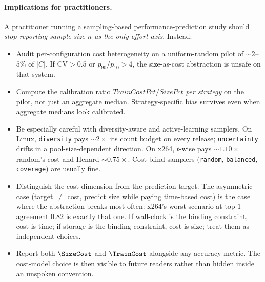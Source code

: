 \paragraph*{Implications for practitioners.}
A practitioner running a sampling-based performance-prediction study should
\emph{stop reporting sample size $n$ as the only effort axis}. Instead:
\begin{itemize}
    \item Audit per-configuration cost heterogeneity on a uniform-random
    pilot of $\sim\!\!2$--$5\%$ of $|C|$. If $\mathrm{CV}\!>\!0.5$ or
    $p_{90}/p_{10}\!>\!4$, the size-as-cost abstraction is unsafe on
    that system.
    \item Compute the calibration ratio
    $\mathit{TrainCostPct}/\mathit{SizePct}$ \emph{per strategy} on the
    pilot, not just an aggregate median. Strategy-specific bias
    survives even when aggregate medians look calibrated.
    \item Be especially careful with diversity-aware and active-learning
    samplers. On Linux, \texttt{diversity} pays $\sim\!\!2\times$ its
    count budget on every release; \texttt{uncertainty} drifts in a
    pool-size-dependent direction. On x264, $t$-wise pays
    $\sim\!\!1.10\times$ random's cost and Henard $\sim\!\!0.75\times$.
    Cost-blind samplers (\texttt{random}, \texttt{balanced},
    \texttt{coverage}) are usually fine.
    \item Distinguish the cost dimension from the prediction target. The
    asymmetric case (target $\neq$ cost, \eg predict size while paying
    time-based cost) is the case where the abstraction breaks most
    often: x264's worst scenario at top-$1$ agreement $0.82$ is exactly
    that one. If wall-clock is the binding constraint, cost is time;
    if storage is the binding constraint, cost is size; treat them as
    independent choices.
    \item Report both $\SizeCost$ and $\TrainCost$ alongside any accuracy
    metric. The cost-model choice is then visible to future readers
    rather than hidden inside an unspoken convention.
\end{itemize}

